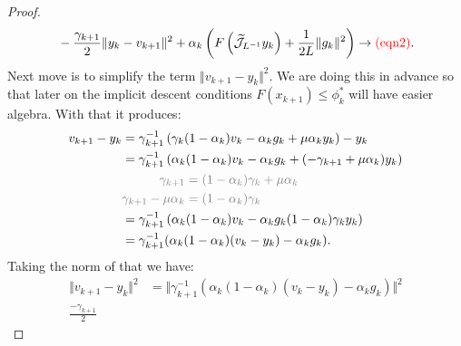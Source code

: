 \documentclass[12pt]{article}
\begin{document}
\begin{proof}
\begin{align*}
            & \quad 
            - \frac{\gamma_{k + 1}}{2}\Vert y_k - v_{k + 1}\Vert^2 
            + 
            \alpha_k\left(
                F\left(\widetilde{\mathcal J}_{L^{-1}} y_k\right) 
                + 
                \frac{1}{2L} \Vert g_k\Vert^2
            \right)
            \rightarrow 
            \textcolor{red}{(\text{eqn2})}. 
        \end{align*}
        Next move is to simplify the term $\Vert v_{k + 1} - y_k\Vert^2$. 
        We are doing this in advance so that later on the implicit descent conditions $F(x_{k + 1}) \le \phi_k^*$ will have easier algebra. 
        With that it produces: 
        \begin{align*}
            v_{k + 1} - y_k 
            &= 
            \gamma_{k + 1}^{-1}
            \left(
                \gamma_k(1 - \alpha_k) v_k - \alpha_k g_k + \mu \alpha_k y_k
            \right) - y_k
            \\
            &= 
            \gamma_{k + 1}^{-1}
            \left(
                \alpha_k(1 - \alpha_k)v_k - \alpha_k g_k 
                + (-\gamma_{k + 1} + \mu\alpha_k)y_k
            \right)
            \\
            &
            \textcolor{gray}{
                \begin{aligned}
                    \gamma_{k + 1} &=    
                    (1 - \alpha_k)\gamma_k + \mu \alpha_k
                    \\
                    \gamma_{k + 1} - \mu \alpha_k &= (1 - \alpha_k)\gamma_k
                \end{aligned}
            }
            \\
            &=
            \gamma_{k + 1}^{-1}
            \left(
                \alpha_k(1 - \alpha_k)v_k - \alpha_k g_k 
                (1 - \alpha_k)\gamma_ky_k
            \right)
            \\
            &= 
            \gamma_{k + 1}^{-1}(
                \alpha_k(1 - \alpha_k)(v_k - y_k) 
                - \alpha_k g_k
            ).
        \end{align*}
        Taking the norm of that we have: 
        \begin{align*}
            \Vert v_{k + 1} - y_k\Vert^2 
            &= 
            \Vert 
                \gamma_{k + 1}^{-1}(
                    \alpha_k(1 - \alpha_k)(v_k - y_k) 
                    - \alpha_k g_k
                )
            \Vert^2
            \\
            \frac{- \gamma_{k + 1}}{2}

\end{align*}
\end{proof}
\end{document}
